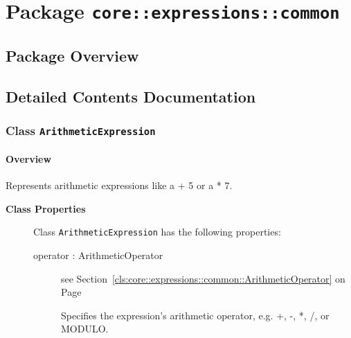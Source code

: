 \section{Package \bfseries \texttt{core::expressions::common}\normalfont}
\subsection{Package Overview}
		



\subsection{Detailed Contents Documentation}
\subsubsection{\Large{Class \bfseries \texttt{ArithmeticExpression}\normalfont}}
\label{cls:core::expressions::common::ArithmeticExpression} 
\paragraph{Overview}

	
			
Represents arithmetic expressions like a + 5 or a * 7.	
		
	


\begin{description}

	\item[\textbf{Class Properties}] Class \texttt{ArithmeticExpression} has the following properties:
	\begin{description}
\item[operator : ArithmeticOperator 	]
see Section~\ref{cls:core::expressions::common::ArithmeticOperator} on Page~\pageref{cls:core::expressions::common::ArithmeticOperator}
\hspace{\fill}
\nopagebreak


	
			
Specifies the expression's arithmetic operator, e.g. +, -, *, /, or MODULO.	
		
	
	\end{description}
	
	

\end{description}

